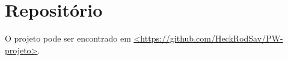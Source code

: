 \section{Repositório}

O projeto pode ser encontrado em \href{https://github.com/HeckRodSav/PW-projeto}{<https://github.com/HeckRodSav/PW-projeto>}.